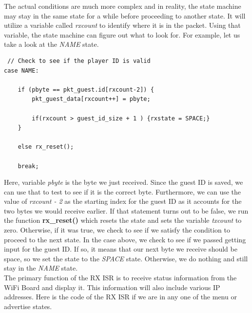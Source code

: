 \documentclass[a4paper, 12pt]{article}
\begin{document}
    The actual conditions are much more complex and in reality, the state
    machine may stay in the same state for a while before proceeding
    to another state. It will utilize a variable called \textit{rxcount} to
    identify where it is in the packet. Using that variable, the state
    machine can figure out what to look for. For example, let us take a look
    at the \textit{NAME} state.

    \begin{verbatim}
 // Check to see if the player ID is valid
case NAME:
    
    if (pbyte == pkt_guest.id[rxcount-2]) {
        pkt_guest_data[rxcount++] = pbyte;
        
        if(rxcount > guest_id_size + 1 ) {rxstate = SPACE;}
    }
    
    else rx_reset();
    
    break;
    \end{verbatim}   

    Here, variable \textit{pbyte} is the byte we just received. Since the
    guest ID is saved, we can use that to test to see if it is the correct
    byte. Furthermore, we can use the value of \textit{rxcount - 2} as the
    starting index for the guest ID as it accounts for the two bytes we would
    receive earlier. If that statement turns out to be false, we run the
    function \textbf{rx\_reset()} which resets the state and sets the 
    variable \textit{txcount} to zero. Otherwise, if it was true, we check to
    see if we satisfy the condition to proceed to the next state. In the case
    above, we check to see if we passed getting input for the guest ID. If so,
    it means that our next byte we receive should be space, so we set the
    state to the \textit{SPACE} state. Otherwise, we do nothing and still
    stay in the \textit{NAME} state.
    \\
    The primary function of the RX ISR is to receive status information from
    the WiFi Board and display it. This information will also include various
    IP addresses. Here is the code of the RX ISR if we are in any one of the
    menu or advertise states.
\end{document}

